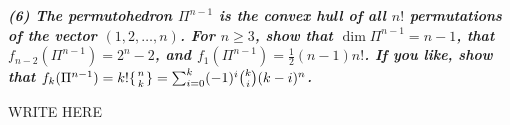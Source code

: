\textbf{\textit{(6) The permutohedron $\Pi^{n-1}$ is the convex hull of all $n!$ permutations of the vector $(1,2,\dots,n)$. For $n\ge3$, show that $\dim\Pi^{n-1}=n-1$, that $f_{n-2}(\Pi^{n-1}) = 2^n-2$, and $f_1(\Pi^{n-1}) = \tfrac12 (n-1)n!$. If you like, show that $f_k(\Pi^{n-1}) = k!\{{n\atop k}\} = \sum_{i=0}^k(-1)^i\binom{k}{i}(k-i)^n$.}}

\vspace{5pt}

WRITE HERE
